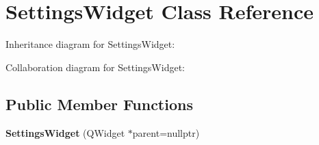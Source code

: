 \hypertarget{classSettingsWidget}{}\section{Settings\+Widget Class Reference}
\label{classSettingsWidget}


Inheritance diagram for Settings\+Widget\+:


Collaboration diagram for Settings\+Widget\+:
\subsection*{Public Member Functions}
\begin{DoxyCompactItemize}
\item 
\mbox{\label{classSettingsWidget_ad6b264d0455806fd3761a7f0e7b75dfd}} 
{\bfseries Settings\+Widget} (Q\+Widget $\ast$parent=nullptr)
\end{DoxyCompactItemize}
